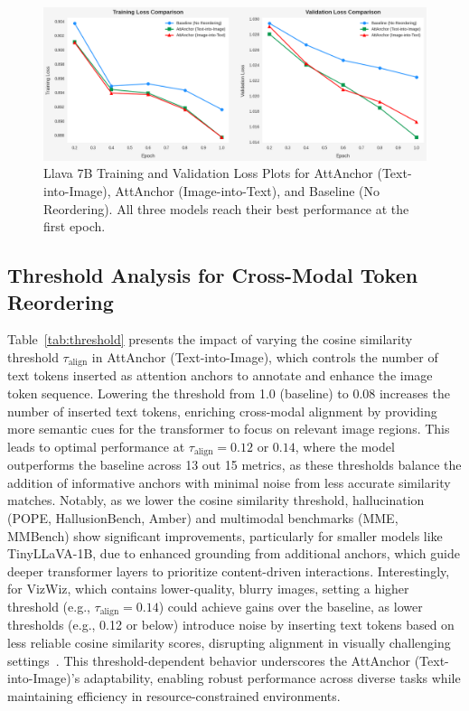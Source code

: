 \documentclass[11pt]{article}
\begin{document}
\begin{figure}[H]
    \centering
    \includegraphics[width=0.9\linewidth]{lossCompare.png}
    \caption{Llava 7B Training and Validation Loss Plots for AttAnchor (Text-into-Image), AttAnchor (Image-into-Text), and Baseline (No Reordering). All three models reach their best performance at the first epoch.}
    \label{fig:loss_plot}
\end{figure}

\subsection{Threshold Analysis for Cross-Modal Token Reordering}
Table~\ref{tab:threshold} presents the impact of varying the cosine similarity threshold $\tau_{\text{align}}$ in AttAnchor (Text-into-Image), which controls the number of text tokens inserted as attention anchors to annotate and enhance the image token sequence. Lowering the threshold from 1.0 (baseline) to 0.08 increases the number of inserted text tokens, enriching cross-modal alignment by providing more semantic cues for the transformer to focus on relevant image regions. This leads to optimal performance at $\tau_{\text{align}} = 0.12$ or $0.14$, where the model outperforms the baseline across 13 out 15 metrics, as these thresholds balance the addition of informative anchors with minimal noise from less accurate similarity matches. Notably, as we lower the cosine similarity threshold, hallucination (POPE, HallusionBench, Amber) and multimodal benchmarks (MME, MMBench) show significant improvements, particularly for smaller models like TinyLLaVA-1B, due to enhanced grounding from additional anchors, which guide deeper transformer layers to prioritize content-driven interactions. Interestingly, for VizWiz, which contains lower-quality, blurry images, setting a higher threshold (e.g., $\tau_{\text{align}} = 0.14$) could achieve gains over the baseline, as lower thresholds (e.g., 0.12 or below) introduce noise by inserting text tokens based on less reliable cosine similarity scores, disrupting alignment in visually challenging settings~\citep{gurari2018vizwiz}. This threshold-dependent behavior underscores the AttAnchor (Text-into-Image)’s adaptability, enabling robust performance across diverse tasks while maintaining efficiency in resource-constrained environments.
\end{document}
